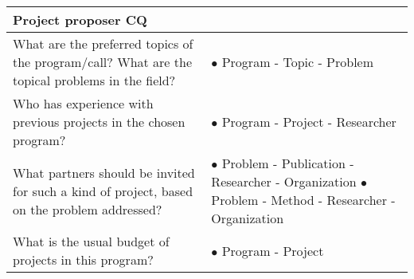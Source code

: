 \begin{table}[]
\begin{tabular}{|p{6cm}|p{6cm}|}
\multicolumn{2}{|l|}{\textbf{Project proposer CQ}}          \\ \hline
                              What are the preferred topics of the program/call? What are the topical problems in the field? &
$\bullet$ Program - Topic - Problem
                      \\ \hline
Who has experience with previous projects in the chosen program?
&
$\bullet$ Program - Project - Researcher 
                      \\ \hline
What partners should be invited for such a kind of project, based on the problem addressed?
&
$\bullet$ Problem - Publication - Researcher - \newline Organization\newline
$\bullet$ Problem - Method - Researcher - Organization
                      \\ \hline
What is the usual budget of projects in this program?
&
$\bullet$ Program - Project
                         \\ \hline

\end{tabular}
\end{table}
